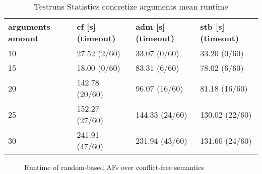 \begin{table}[H]
    \centering
    \caption{Testruns Statistics concretize arguments mean runtime}
    \begin{tabular}{ |l|l|l|l| }
        \hline
            arguments amount & cf [s] (timeout)& adm [s] (timeout)& stb [s] (timeout)\\
        \hline
            10 & 27.52 \hfill (2/60) & 33.07 \hfill (0/60) & 33.20 \hfill (0/60) \\
            15 & 18.00 \hfill (0/60) & 83.31 \hfill (6/60) & 78.02 \hfill (6/60) \\
            20 & 142.78 \hfill (20/60) & 96.07 \hfill (16/60) & 81.18 \hfill (16/60) \\
            25 & 152.27 \hfill (27/60) & 144.33 \hfill (24/60) & 130.02 \hfill (22/60) \\
            30 & 241.91 \hfill (47/60) & 231.94 \hfill (43/60) & 131.60 \hfill (24/60) \\
        \hline
    \end{tabular}
\label{table:ExperimentStatisticsConcretize}
\end{table}


\begin{figure}[H]
    \centering
    \caption{Runtime of random-based AFs over conflict-free semantics}
    \label{fig:expconcretize/BFSvsDFS/random/CF}
\end{figure}


